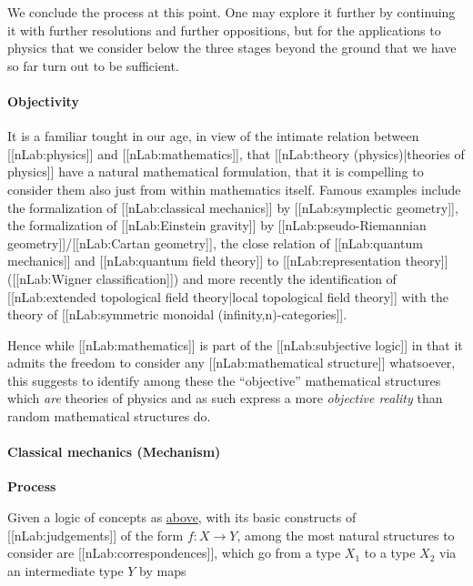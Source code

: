 \documentclass[12pt,titlepage]{article}
\theoremstyle{plain}
\theoremstyle{definition}
\theoremstyle{remark}
\begin{document}
$\,$



We conclude the process at this point. One may explore it further by continuing it with further resolutions and further oppositions, but for the applications to physics that we consider below the three stages beyond the ground that we have so far turn out to be sufficient.

\hypertarget{objectivity}{}\paragraph*{{Objectivity}}\label{objectivity}

It is a familiar tought in our age, in view of the intimate relation between [[nLab:physics]] and [[nLab:mathematics]], that [[nLab:theory (physics)|theories of physics]] have a natural mathematical formulation, that it is compelling to consider them also just from within mathematics itself. Famous examples include the formalization of [[nLab:classical mechanics]] by [[nLab:symplectic geometry]], the formalization of [[nLab:Einstein gravity]] by [[nLab:pseudo-Riemannian geometry]]/[[nLab:Cartan geometry]], the close relation of [[nLab:quantum mechanics]] and [[nLab:quantum field theory]] to [[nLab:representation theory]] ([[nLab:Wigner classification]]) and more recently the identification of [[nLab:extended topological field theory|local topological field theory]] with the theory of [[nLab:symmetric monoidal (infinity,n)-categories]].

Hence while [[nLab:mathematics]] is part of the [[nLab:subjective logic]] in that it admits the freedom to consider any [[nLab:mathematical structure]] whatsoever, this suggests to identify among these the ``objective'' mathematical structures which \emph{are} theories of physics and as such express a more \emph{objective reality} than random mathematical structures do.

\hypertarget{classical_mechanics_mechanism}{}\paragraph*{{Classical mechanics (Mechanism)}}\label{classical_mechanics_mechanism}

\textbf{Process}

Given a logic of concepts as \hyperlink{ConceptFormalization}{above}, with its basic constructs of [[nLab:judgements]] of the form $f \colon X \to Y$, among the most natural structures to consider are [[nLab:correspondences]], which go from a type $X_1$ to a type $X_2$ via an intermediate type $Y$ by maps
\end{document}
